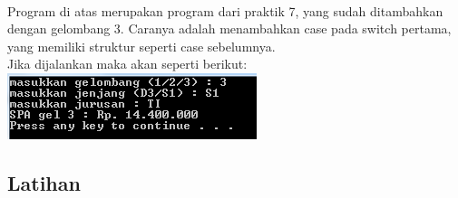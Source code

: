 \documentclass[a4paper,12pt]{article}
\begin{document}
\begin{enumerate}[label=\textbf{\arabic* .}]
            \paragraph{}
            Program di atas merupakan program dari praktik 7, yang sudah ditambahkan dengan gelombang 3. Caranya adalah menambahkan case pada switch pertama, yang memiliki struktur seperti case sebelumnya.\\
            Jika dijalankan maka akan seperti berikut:\\
            \includegraphics{09b.PNG}
    \end{enumerate}

    \subsection{Latihan}
\end{document}
